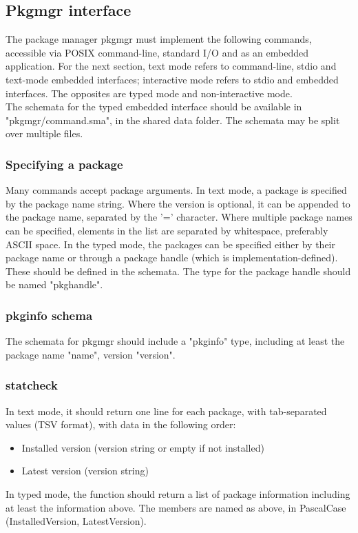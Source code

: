 \subsection{Pkgmgr interface}
The package manager pkgmgr must implement the following commands, accessible via POSIX command-line, standard I/O and as an embedded application. For the next section, text mode refers to command-line, stdio and text-mode embedded interfaces; interactive mode refers to stdio and embedded interfaces. The opposites are typed mode and non-interactive mode.\\
The schemata for the typed embedded interface should be available in "pkgmgr/command.sma", in the shared data folder. The schemata may be split over multiple files.
\subsubsection{Specifying a package}
Many commands accept package arguments. In text mode, a package is specified by the package name string. Where the version is optional, it can be appended to the package name, separated by the '=' character. Where multiple package names can be specified, elements in the list are separated by whitespace, preferably ASCII space. In the typed mode, the packages can be specified either by their package name or through a package handle (which is implementation-defined). These should be defined in the schemata. The type for the package handle should be named "pkghandle".
\subsubsection{pkginfo schema}
The schemata for pkgmgr should include a "pkginfo" type, including at least the package name "name", version "version".
\subsubsection{statcheck}
In text mode, it should return one line for each package, with tab-separated values (TSV format), with data in the following order:
\begin{itemize}
	\item Installed version (version string or empty if not installed)
	\item Latest version (version string)
\end{itemize}
In typed mode, the function should return a list of package information including at least the information above. The members are named as above, in PascalCase (InstalledVersion, LatestVersion).
